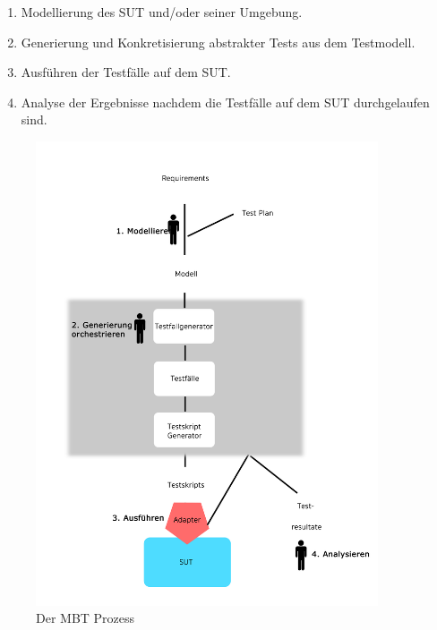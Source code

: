 \begin{enumerate}
\item Modellierung des \Gls{SUT} und/oder seiner Umgebung.
\item Generierung und Konkretisierung abstrakter Tests aus dem Testmodell.
\item Ausführen der Testfälle auf dem SUT.
\item Analyse der Ergebnisse nachdem die Testfälle auf dem \Gls{SUT} durchgelaufen sind.
\end{enumerate}

\begin{figure}[h] 
  \centering
     \includegraphics[width=0.9\textwidth]{figures/MBT_Prozess.png}
  \caption{Der \Gls{MBT} Prozess \cite{utting_practical_2007}}
  \label{fig:mbt_prozess}
\end{figure}


